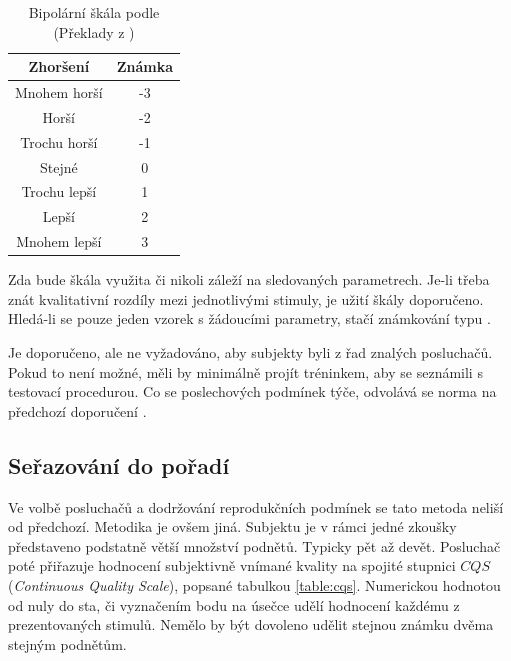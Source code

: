 \begin{table}[h]
\centering
\begin{tabular}{|c|c|}
\hline
Zhoršení       & Známka \\ \hline
Mnohem horší              & -3      \\ \hline
Horší & -2      \\ \hline
Trochu horší       & -1      \\ \hline
Stejné              & 0      \\ \hline
Trochu lepší        & 1      \\ \hline
Lepší        & 2      \\ \hline
Mnohem lepší        & 3      \\ \hline
\end{tabular}
\caption{Bipolární škála podle \cite{itur:1284} (Překlady z \cite{book:melka})}
\label{table:bipolarscale}
\end{table}

Zda bude škála využita či nikoli záleží na sledovaných parametrech. Je-li třeba znát kvalitativní rozdíly mezi jednotlivými stimuly, je užití škály doporučeno. Hledá-li se pouze jeden vzorek s žádoucími parametry, stačí známkování typu . 

Je doporučeno, ale ne vyžadováno, aby subjekty byli z řad znalých posluchačů. Pokud to není možné, měli by minimálně projít tréninkem, aby se seznámili s testovací procedurou. Co se poslechových podmínek týče, odvolává se norma na předchozí doporučení \cite{itur:1116}.

\subsection{Seřazování do pořadí}

Ve volbě posluchačů a dodržování reprodukčních podmínek se tato metoda neliší od předchozí. Metodika je ovšem jiná. Subjektu je v rámci jedné zkoušky představeno podstatně větší množství podnětů. Typicky pět až devět. Posluchač poté přiřazuje hodnocení subjektivně vnímané kvality na spojité stupnici $CQS$ (\textit{Continuous Quality Scale}), popsané tabulkou \ref{table:cqs}. Numerickou hodnotou od nuly do sta, či vyznačením bodu na úsečce udělí hodnocení každému z prezentovaných stimulů. Nemělo by být dovoleno udělit stejnou známku dvěma stejným podnětům.

